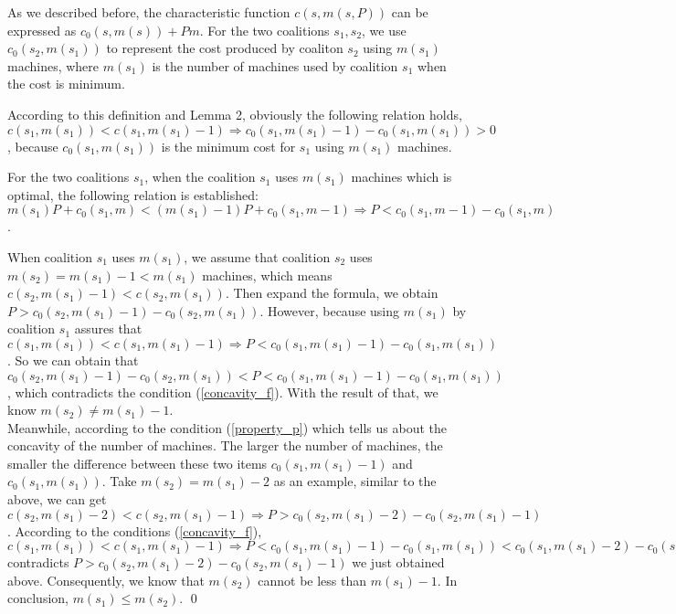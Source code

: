 \begin{pf}[Theorem 7]

As we described before, the characteristic function $c(s,m(s,P))$ can be expressed as $c_0(s,m(s))+Pm$. For the two coalitions $s_1, s_2$, we use $c_0(s_2,m(s_1))$ to represent the cost produced by coaliton $s_2$ using $m(s_1)$ machines, where $m(s_1)$ is the number of machines used by coalition $s_1$ when the cost is minimum.

According to this definition and Lemma 2, obviously the following relation holds,
$c(s_1,m(s_1)) < c(s_1,m(s_1)-1) \Rightarrow c_0(s_1,m(s_1)-1)-c_0(s_1,m(s_1))>0$, because $c_0(s_1,m(s_1))$ is the minimum cost for $s_1$ using $m(s_1)$ machines.

For the two coalitions $s_1$, when the coalition $s_1$ uses $m(s_1)$ machines which is optimal, the following relation is established:
$m(s_1)P+c_0(s_1,m) < (m(s_1)-1)P+c_0(s_1,m-1) \Rightarrow P < c_0(s_1,m-1) - c_0(s_1,m)$.

When coalition $s_1$ uses $m(s_1)$, we assume that coalition $s_2$ uses $m(s_2)=m(s_1)-1<m(s_1)$ machines, which means $c(s_2,m(s_1)-1) < c(s_2,m(s_1))$. Then expand the formula, we obtain $P > c_0(s_2,m(s_1)-1)- c_0(s_2,m(s_1))$. However, because using $m(s_1)$ by coalition $s_1$ assures that $c(s_1,m(s_1)) < c(s_1,m(s_1)-1) \Rightarrow P < c_0(s_1,m(s_1)-1)-c_0(s_1,m(s_1))$.
So we can obtain that $ c_0(s_2,m(s_1)-1)- c_0(s_2,m(s_1)) <P <c_0(s_1,m(s_1)-1)-c_0(s_1,m(s_1))$, which contradicts the condition (\ref{concavity_f}).
With the result of that, we know $m(s_2) \neq m(s_1)-1$. \\
Meanwhile, according to the condition (\ref{property_p}) which tells us about the concavity of the number of machines. The larger the number of machines, the smaller the difference between these two items $c_0(s_1,m(s_1)-1)$ and $c_0(s_1,m(s_1))$. Take $m(s_2) = m(s_1)-2$ as an example, similar to the above, we can get $c(s_2,m(s_1)-2) < c(s_2,m(s_1)-1) \Rightarrow P > c_0(s_2,m(s_1)-2) - c_0(s_2,m(s_1)-1)$. According to the conditions (\ref{concavity_f}),
$c(s_1,m(s_1)) < c(s_1,m(s_1)-1) \Rightarrow P < c_0(s_1,m(s_1)-1)-c_0(s_1,m(s_1)) < c_0(s_1,m(s_1)-2)-c_0(s_1,m(s_1)-1) < c_0(s_2,m(s_1)-2) - c_0(s_2,m(s_1)-1)$ contradicts
$P > c_0(s_2,m(s_1)-2) - c_0(s_2,m(s_1)-1)$ we just obtained above.
Consequently, we know that $m(s_2)$ cannot be less than $m(s_1)-1$.
In conclusion, $m(s_1) \leq m(s_2)$.
\qed
\end{pf}

